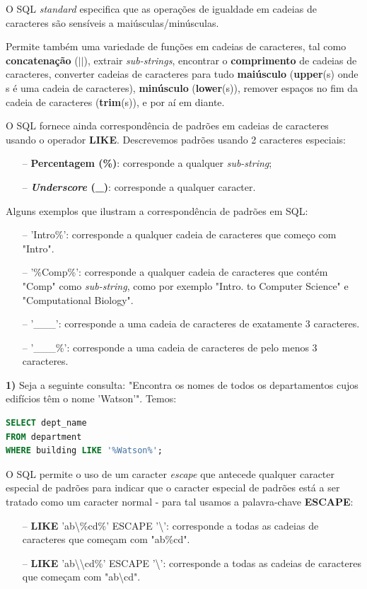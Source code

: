 \documentclass[oneside]{book}
\theoremstyle{definition}
\begin{document}
O SQL \textit{standard} especifica que as operações de igualdade em cadeias de caracteres são sensíveis a maiúsculas/minúsculas.

Permite também uma variedade de funções em cadeias de caracteres, tal como \textbf{concatenação} ($||$), extrair \textit{sub-strings}, encontrar o \textbf{comprimento} de cadeias de caracteres, converter cadeias de caracteres para tudo \textbf{maiúsculo} (\textbf{upper}(s) onde s é uma cadeia de caracteres), \textbf{minúsculo} (\textbf{lower}(s)), remover espaços no fim da cadeia de caracteres (\textbf{trim}(s)), e por aí em diante.

O SQL fornece ainda correspondência de padrões em cadeias de caracteres usando o operador \textbf{LIKE}. Descrevemos padrões usando 2 caracteres especiais:
\begin{itemize}
    \itemsep0cm
    \item[--]\textbf{Percentagem (\%)}: corresponde a qualquer \textit{sub-string};
    \item[--]\textbf{\textit{Underscore} (\_)}: corresponde a qualquer caracter.
\end{itemize}

Alguns exemplos que ilustram a correspondência de padrões em SQL:
\begin{itemize}
    \itemsep0cm
    \item[--]'Intro\%': corresponde a qualquer cadeia de caracteres que começo com "Intro".
    \item[--]'\%Comp\%': corresponde a qualquer cadeia de caracteres que contém "Comp" como \textit{sub-string}, como por exemplo "Intro. to Computer Science" e "Computational Biology".
    \item[--]'\_\_\_': corresponde a uma cadeia de caracteres de exatamente 3 caracteres.
    \item[--]'\_\_\_\%': corresponde a uma cadeia de caracteres de pelo menos 3 caracteres.
\end{itemize}

\textbf{1)} Seja a seguinte consulta: "Encontra os nomes de todos os departamentos cujos edifícios têm o nome 'Watson'". Temos:
\begin{lstlisting}[language=SQL, morekeywords={REFERENCES, REFRESH, MATERIALIZED, CONCURRENTLY}, framesep=8pt, xleftmargin=40pt, framexleftmargin=40pt, frame=tb, framerule=0pt]
SELECT dept_name
FROM department
WHERE building LIKE '%Watson%';
\end{lstlisting}

O SQL permite o uso de um caracter \textit{escape} que antecede qualquer caracter especial de padrões para indicar que o caracter especial de padrões está a ser tratado como um caracter normal - para tal usamos a palavra-chave \textbf{ESCAPE}:
\begin{itemize}
    \itemsep0cm
    \item[--]\textbf{LIKE} 'ab\textbackslash\%cd\%' ESCAPE '\textbackslash': corresponde a todas as cadeias de caracteres que começam com "ab\%cd".
    \item[--]\textbf{LIKE} 'ab\textbackslash \textbackslash cd\%' ESCAPE '\textbackslash': corresponde a todas as cadeias de caracteres que começam com "ab\textbackslash cd".
\end{itemize}
\end{document}
